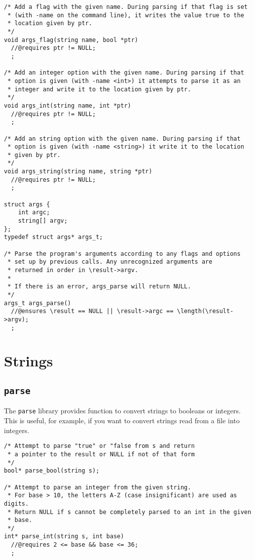 \documentclass[11pt]{article}
\begin{document}
\begin{small}
\begin{verbatim}
/* Add a flag with the given name. During parsing if that flag is set
 * (with -name on the command line), it writes the value true to the
 * location given by ptr.
 */
void args_flag(string name, bool *ptr)
  //@requires ptr != NULL;
  ;

/* Add an integer option with the given name. During parsing if that
 * option is given (with -name <int>) it attempts to parse it as an
 * integer and write it to the location given by ptr.
 */
void args_int(string name, int *ptr)
  //@requires ptr != NULL;
  ;

/* Add an string option with the given name. During parsing if that
 * option is given (with -name <string>) it write it to the location
 * given by ptr.
 */
void args_string(string name, string *ptr)
  //@requires ptr != NULL;
  ;

struct args {
    int argc;
    string[] argv;
};
typedef struct args* args_t;

/* Parse the program's arguments according to any flags and options
 * set up by previous calls. Any unrecognized arguments are
 * returned in order in \result->argv.
 *
 * If there is an error, args_parse will return NULL.
 */
args_t args_parse()
  //@ensures \result == NULL || \result->argc == \length(\result->argv);
  ;
\end{verbatim}
\end{small}

\section{Strings}

\subsection{\tt parse}

The \verb'parse' library provides function to convert
strings to booleans or integers.  This is useful, for
example, if you want to convert strings read from a
file into integers.

\begin{small}
\begin{verbatim}
/* Attempt to parse "true" or "false from s and return
 * a pointer to the result or NULL if not of that form
 */
bool* parse_bool(string s);

/* Attempt to parse an integer from the given string.
 * For base > 10, the letters A-Z (case insignificant) are used as digits.
 * Return NULL if s cannot be completely parsed to an int in the given
 * base.
 */
int* parse_int(string s, int base)
  //@requires 2 <= base && base <= 36;
  ;
\end{verbatim}
\end{small}
\end{document}
